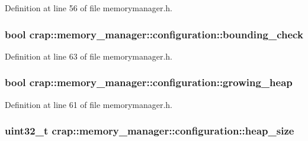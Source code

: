 Definition at line 56 of file memorymanager.\+h.

\hypertarget{structcrap_1_1memory__manager_1_1configuration_a08b165edae1810bab7f671cf90ee1c1a}{
\subsubsection[{bounding\+\_\+check}]{\setlength{\rightskip}{0pt plus 5cm}bool crap\+::memory\+\_\+manager\+::configuration\+::bounding\+\_\+check}}\label{structcrap_1_1memory__manager_1_1configuration_a08b165edae1810bab7f671cf90ee1c1a}


Definition at line 63 of file memorymanager.\+h.

\hypertarget{structcrap_1_1memory__manager_1_1configuration_a942e759edcd1129f4571691e87172f8f}{
\subsubsection[{growing\+\_\+heap}]{\setlength{\rightskip}{0pt plus 5cm}bool crap\+::memory\+\_\+manager\+::configuration\+::growing\+\_\+heap}}\label{structcrap_1_1memory__manager_1_1configuration_a942e759edcd1129f4571691e87172f8f}


Definition at line 61 of file memorymanager.\+h.

\hypertarget{structcrap_1_1memory__manager_1_1configuration_aa7b7dd302d12394b4933cd10c19b9bb3}{
\subsubsection[{heap\+\_\+size}]{\setlength{\rightskip}{0pt plus 5cm}uint32\+\_\+t crap\+::memory\+\_\+manager\+::configuration\+::heap\+\_\+size}}\label{structcrap_1_1memory__manager_1_1configuration_aa7b7dd302d12394b4933cd10c19b9bb3}


